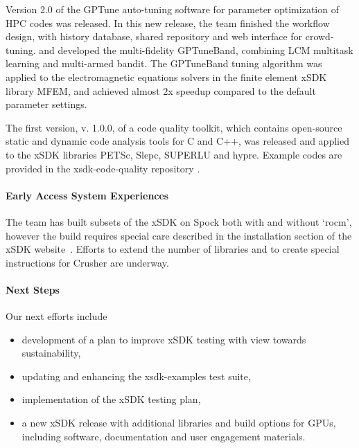 Version 2.0 of the GPTune auto-tuning software for parameter optimization of HPC codes \cite{gptune:homepage} was released. In this new release, the team finished the workflow design, with history database, shared repository and web interface for crowd-tuning. and developed the multi-fidelity GPTuneBand, combining LCM multitask learning and multi-armed bandit. The  GPTuneBand tuning algorithm was applied to the electromagnetic equations solvers in the finite element xSDK library MFEM, and achieved almost 2x speedup compared to the default parameter settings.     

The first version, v. 1.0.0, of a code quality toolkit, which contains open-source static and dynamic code analysis tools for C and C++, was released and applied to the xSDK libraries PETSc, Slepc, SUPERLU and hypre. Example codes are provided in the xsdk-code-quality repository \cite{xsdk-code-quality}.

\paragraph{Early Access System Experiences}

The team has built subsets of the xSDK on Spock both with and without `rocm', however the build requires special care described in the installation section of the xSDK website~\cite{xsdk:homepage}. Efforts to extend the number of libraries and to create special instructions for Crusher are underway.

\paragraph{Next Steps}

Our next efforts include 
\begin{itemize}
    \item development of a plan to improve xSDK testing with view towards sustainability,
    \item updating and enhancing the xsdk-examples test suite,
    \item implementation of the xSDK testing plan,
   \item a new xSDK release with additional libraries and build options for GPUs, including software, documentation and user engagement materials.
\end{itemize}


